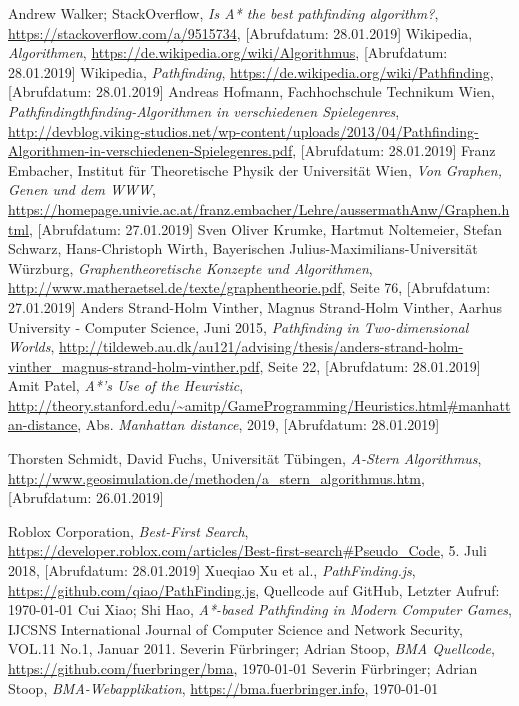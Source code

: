 \begin{thebibliography}{9}
  Andrew Walker; StackOverflow,
  \textit{Is A* the best pathfinding algorithm?},
  \url{https://stackoverflow.com/a/9515734},
  [Abrufdatum: 28.01.2019]
  Wikipedia,
  \textit{Algorithmen},
  \url{https://de.wikipedia.org/wiki/Algorithmus},
  [Abrufdatum: 28.01.2019]
  Wikipedia,
  \textit{Pathfinding},
  \url{https://de.wikipedia.org/wiki/Pathfinding},
  [Abrufdatum: 28.01.2019]
  Andreas Hofmann, Fachhochschule Technikum Wien,
  \textit{Pathfindingthfinding-Algorithmen in verschiedenen Spielegenres},
  \url{http://devblog.viking-studios.net/wp-content/uploads/2013/04/Pathfinding-Algorithmen-in-verschiedenen-Spielegenres.pdf},
  [Abrufdatum: 28.01.2019]
  Franz Embacher, Institut für Theoretische Physik der Universität Wien,
  \textit{Von Graphen, Genen und dem WWW},
  \url{https://homepage.univie.ac.at/franz.embacher/Lehre/aussermathAnw/Graphen.html},
  [Abrufdatum: 27.01.2019]
  Sven Oliver Krumke, Hartmut Noltemeier, Stefan Schwarz, Hans-Christoph Wirth,
  Bayerischen Julius-Maximilians-Universität Würzburg,
  \textit{Graphentheoretische Konzepte und Algorithmen},
  \url{http://www.matheraetsel.de/texte/graphentheorie.pdf},
  Seite 76,
  [Abrufdatum: 27.01.2019]
  Anders Strand-Holm Vinther, Magnus Strand-Holm Vinther, Aarhus University - Computer Science, Juni 2015,
  \textit{Pathfinding in Two-dimensional Worlds},
  \url{http://tildeweb.au.dk/au121/advising/thesis/anders-strand-holm-vinther\_magnus-strand-holm-vinther.pdf},
  Seite 22,
  [Abrufdatum: 28.01.2019]
  Amit Patel,
  \textit{A*'s Use of the Heuristic},
  \url{http://theory.stanford.edu/~amitp/GameProgramming/Heuristics.html\#manhattan-distance},
  Abs. \textit{Manhattan distance},
  2019, 
  [Abrufdatum: 28.01.2019]

  Thorsten Schmidt, David Fuchs, Universität Tübingen,
  \textit{A-Stern Algorithmus},
  \url{http://www.geosimulation.de/methoden/a\_stern\_algorithmus.htm},
  [Abrufdatum: 26.01.2019]

  Roblox Corporation, 
  \textit{Best-First Search},
  \url{https://developer.roblox.com/articles/Best-first-search\#Pseudo\_Code},
  5. Juli 2018,
  [Abrufdatum: 28.01.2019]
  Xueqiao Xu et al.,
  \textit{PathFinding.js},
  \url{https://github.com/qiao/PathFinding.js},
  Quellcode auf GitHub,
  Letzter Aufruf: \today
{}
  Cui Xiao; Shi Hao,
  \textit{A*-based Pathfinding in Modern Computer Games},
  IJCSNS International Journal of Computer Science and Network Security, VOL.11 No.1,
  Januar 2011.
  Severin Fürbringer; Adrian Stoop,
  \textit{BMA Quellcode},
  \url{https://github.com/fuerbringer/bma},
  \today
{}
  Severin Fürbringer; Adrian Stoop,
  \textit{BMA-Webapplikation},
  \url{https://bma.fuerbringer.info},
  \today
\end{thebibliography}
